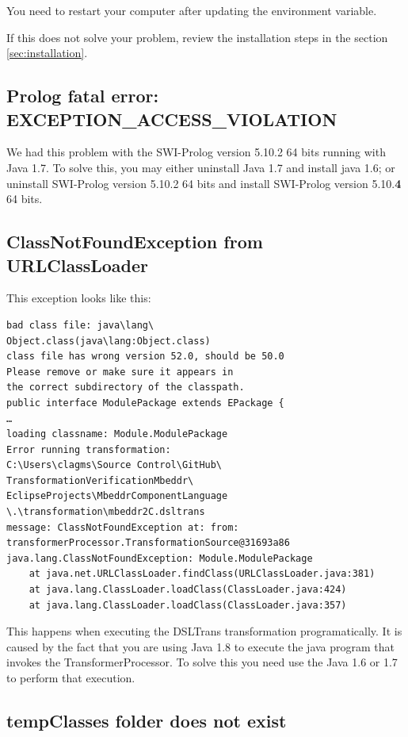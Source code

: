 You need to restart your computer after updating the environment variable.

If this does not solve your problem, review the installation steps in the section \ref{sec:installation}.

\subsection{Prolog fatal error: EXCEPTION\_ACCESS\_VIOLATION}

We had this problem with the SWI-Prolog version 5.10.2 64 bits running with Java 1.7.
To solve this, you may either uninstall Java 1.7 and install java 1.6; 
or uninstall SWI-Prolog version 5.10.2 64 bits and install SWI-Prolog version 5.10.\textbf{4} 64 bits.


\subsection{ClassNotFoundException from URLClassLoader}

This exception looks like this:
\begin{verbatim}
bad class file: java\lang\
Object.class(java\lang:Object.class)
class file has wrong version 52.0, should be 50.0
Please remove or make sure it appears in 
the correct subdirectory of the classpath.
public interface ModulePackage extends EPackage {
…
loading classname: Module.ModulePackage
Error running transformation: 
C:\Users\clagms\Source Control\GitHub\
TransformationVerificationMbeddr\
EclipseProjects\MbeddrComponentLanguage
\.\transformation\mbeddr2C.dsltrans
message: ClassNotFoundException at: from: 
transformerProcessor.TransformationSource@31693a86
java.lang.ClassNotFoundException: Module.ModulePackage
	at java.net.URLClassLoader.findClass(URLClassLoader.java:381)
	at java.lang.ClassLoader.loadClass(ClassLoader.java:424)
	at java.lang.ClassLoader.loadClass(ClassLoader.java:357)
\end{verbatim}

This happens when executing the DSLTrans transformation programatically.
It is caused by the fact that you are using Java 1.8 to execute the java program that invokes the TransformerProcessor.
To solve this you need use the Java 1.6 or 1.7 to perform that execution.


\subsection{tempClasses folder does not exist}

